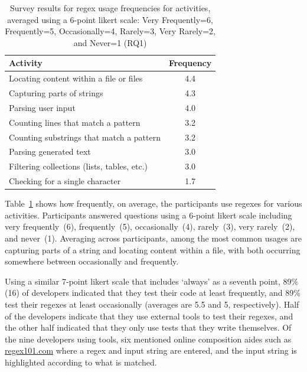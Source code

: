 \begin{table}
\caption{Survey results for regex usage frequencies for  activities, averaged using a 6-point likert scale: Very Frequently=6, Frequently=5, Occasionally=4, Rarely=3, Very Rarely=2, and Never=1 (RQ1)\label{tab:regexactivities}}
\begin{center}
\begin{small}
\begin{tabular}{l|c}
\toprule
\textbf{Activity} & \textbf{Frequency} \\  \hline \bigstrut
Locating content within a file or files & 4.4\\ \hline \bigstrut
Capturing parts of strings & 4.3 \\ \hline \bigstrut
Parsing user input & 4.0\\ \hline \bigstrut
Counting lines that match a pattern & 3.2\\ \hline \bigstrut
Counting  substrings that match a pattern & 3.2\\  \hline \bigstrut
Parsing generated text & 3.0\\  \hline \bigstrut
Filtering collections (lists, tables, etc.) & 3.0 \\ \hline \bigstrut
Checking for a single character & 1.7\\
\bottomrule
\end{tabular}
\end{small}
\end{center}
\vspace{-12pt}
\end{table}

Table~\ref{tab:regexactivities} shows how frequently, on average, the participants use
regexes for various activities.
Participants answered questions using a 6-point likert scale including very frequently~(6), frequently~(5), occasionally~(4), rarely~(3), very rarely~(2), and never~(1).
Averaging across participants, among the most common usages are capturing parts of a string and locating content within a file, with both occurring somewhere between occasionally and frequently.

Using a similar 7-point likert scale that includes `always' as a seventh point, 89\% (16) of developers indicated that they test their code at least frequently, and 89\% test their regexes at least occasionally (averages are 5.5 and 5, respectively).  Half of the  developers indicate that they use external tools to test their regexes, and the other half indicated that they only use tests that they write themselves. Of the nine developers using tools, six mentioned online composition aides such as \url{regex101.com} where a regex and input string are entered, and the input string is highlighted according to what is matched.

